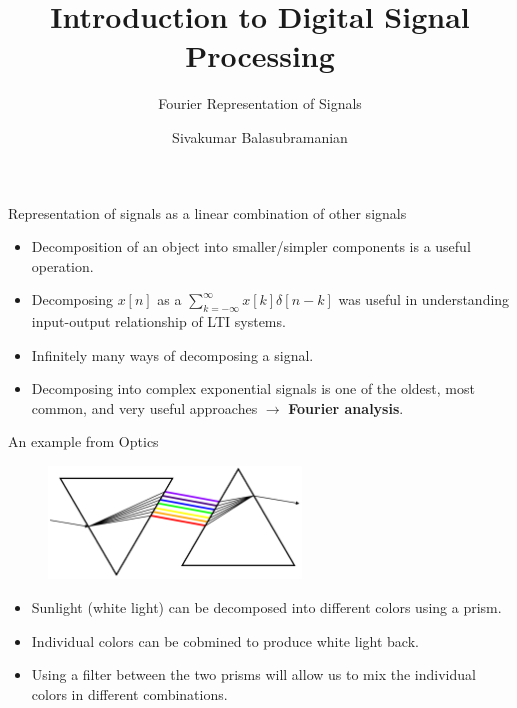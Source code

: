 \documentclass[aspectratio=169]{beamer}
\title{Introduction to Digital Signal Processing}
\subtitle{Fourier Representation of Signals}
\author{Sivakumar Balasubramanian}
\institute[Christian Medical College] %
{
  \inst{}%
  Department of Bioengineering\\
  Christian Medical College, Bagayam\\
  Vellore 632002
}
\date{}
\let\olditem\item
\renewcommand{\item}{\setlength{\itemsep}{\fill}\olditem}
\begin{document}
\begin{frame}
  \titlepage
\end{frame}


\begin{frame}[t]{Representation of signals as a linear combination of other signals}
  \begin{itemize}
    \item Decomposition of an object into smaller/simpler components is a useful operation.

     \item Decomposing $x[n]$ as a $\sum_{k=-\infty}^{\infty} x[k] \delta[n - k]$ was useful in understanding input-output relationship of LTI systems.

     \item Infinitely many ways of decomposing a signal.

     \item Decomposing into complex exponential signals is one of the oldest, most common, and very useful approaches $\longrightarrow$ \textbf{Fourier analysis}.
  \end{itemize}
\end{frame}


\begin{frame}[t]{An example from Optics}
  \begin{figure}
  \includegraphics[width=0.6\textwidth]{img/decomp.png}
  \end{figure}

  \begin{itemize}
    \item Sunlight (white light) can be decomposed into different colors using a prism.

    \item Individual colors can be cobmined to produce white light back.
  
    \item Using a filter between the two prisms will allow us to mix the individual colors in different combinations.
  \end{itemize}
\end{frame}
\end{document}
